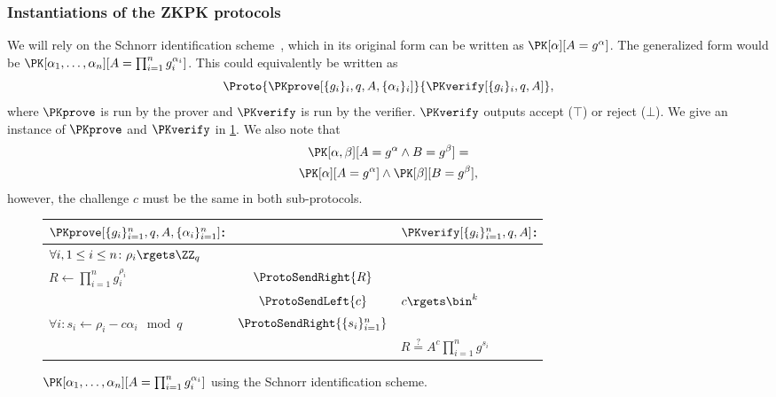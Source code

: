 \subsubsection*{Instantiations of the \acs{ZKPK} protocols}

We will rely on the Schnorr identification scheme~\cite{Schnorr}, which in its 
original form can be written as \(\PK[\alpha][A = g^\alpha]\).
The generalized form would be \(\PK[\alpha_1, \dotsc, \alpha_n][A = 
    \prod_{i=1}^n g_i^{\alpha_i}]\).
This could equivalently be written as
\begin{equation*}
  \Proto%
  {\PKprove[\{g_i\}_i, q, A, \{\alpha_i\}_i]}%
  {\PKverify[\{g_i\}_i, q, A]},
\end{equation*}
where \(\PKprove\) is run by the prover and \(\PKverify\) is run by the 
verifier.
\(\PKverify\) outputs accept (\(\top\)) or reject (\(\bot\)).
We give an instance of \(\PKprove\) and \(\PKverify\) in \cref{PKalgorithms}.
We also note that
\begin{multline*}
  \PK[\alpha, \beta][A = g^\alpha \land B = g^\beta] = \\
  \PK[\alpha][A = g^\alpha] \land \PK[\beta][B = g^\beta],
\end{multline*}
however, the challenge \(c\) must be the same in both sub-protocols.

\begin{figure*}
  \small
  \begin{tabular}{lcl}
    \(\PKprove[\{g_i\}_{i=1}^n, q, A, \{\alpha_i\}_{i=1}^n]\):
    &
    & \(\PKverify[\{g_i\}_{i=1}^n, q, A]\):
    \\
    \midrule

    \(\forall i, 1\leq i\leq n\colon \rho_i\rgets \ZZ_q\)
    &
    &
    \\

    \(R\gets \prod_{i=1}^n g_i^{\rho_i}\)
    & \(\ProtoSendRight{R}\)
    &
    \\

    & \(\ProtoSendLeft{c}\)
    & \(c\rgets \bin^k\)
    \\

    \(\forall i\colon s_i\gets \rho_i - c\alpha_i \mod q\)
    & \(\ProtoSendRight{\{s_i\}_{i=1}^n}\)
    &
    \\

    &
    & \(R \stackrel{?}{=} A^c \prod_{i=1}^n g^{s_i}\)
    \\
    
  \end{tabular}
  \caption{%
    \(\PK[\alpha_1, \dotsc, \alpha_n][A = \prod_{i=1}^n g_i^{\alpha_i}]\) using 
    the Schnorr identification scheme.
  }%
  \label{PKalgorithms}
\end{figure*}

